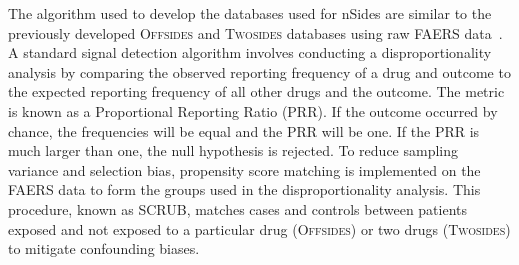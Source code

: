 \documentclass{ws-procs11x85}
\begin{document}
The algorithm used to develop the databases used for nSides are
similar to the previously developed O\textsc{ffsides} and
T\textsc{wosides} databases using raw FAERS data~\cite{Tatonetti2012}.
A standard signal detection algorithm involves conducting a
disproportionality analysis by comparing the observed reporting
frequency of a drug and outcome to the expected reporting frequency of
all other drugs and the outcome. The metric is known as a Proportional
Reporting Ratio (PRR). If the outcome occurred by chance, the
frequencies will be equal and the PRR will be one. If the PRR is much
larger than one, the null hypothesis is rejected. To reduce sampling
variance and selection bias, propensity score matching is implemented
on the FAERS data to form the groups used in the disproportionality
analysis. This procedure, known as SCRUB, matches cases and controls
between patients exposed and not exposed to a particular drug
(O\textsc{ffsides}) or two drugs (T\textsc{wosides}) to mitigate
confounding biases.



\end{document}
